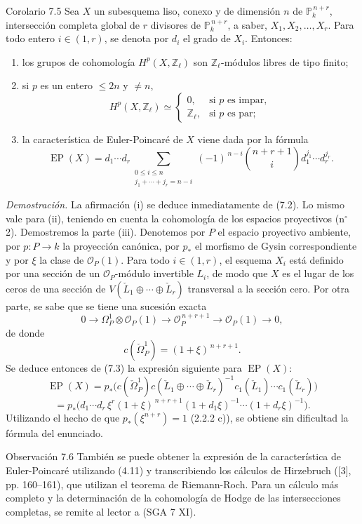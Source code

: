 \begin{statement}{Corolario 7.5}
Sea $X$ un subesquema liso, conexo y de dimensión $n$ de $\mathbb P_k^{\,n+r}$, intersección completa global de $r$ divisores de $\mathbb P_k^{\,n+r}$, a saber, $X_1,X_2,\ldots,X_r$. Para todo entero $i\in(1,r)$, se denota por $d_i$ el grado de $X_i$. Entonces:
\begin{enumerate}[label=(\roman*)]
\item los grupos de cohomología $H^p(X,\mathbb Z_\ell)$ son $\mathbb Z_\ell$-módulos libres de tipo finito;
\item si $p$ es un entero $\le 2n$ y $\ne n$,
\[
H^p(X,\mathbb Z_\ell)\simeq
\begin{cases}
0,&\text{si }p\text{ es impar},\\
\mathbb Z_\ell,&\text{si }p\text{ es par};
\end{cases}
\]
\item la característica de Euler-Poincaré de $X$ viene dada por la fórmula
\[
\operatorname{EP}(X)
=d_1\cdots d_r
\sum_{\substack{0\le i\le n\\ j_1+\cdots+j_r=n-i}}
(-1)^{\,n-i}\binom{n+r+1}{i}
d_1^{j_1}\cdots d_r^{j_r}.
\]
\end{enumerate}
\end{statement}

\emph{Demostración.} La afirmación (i) se deduce inmediatamente de (7.2). Lo mismo vale para (ii), teniendo en cuenta la cohomología de los espacios proyectivos (n$^\circ$ 2). Demostremos la parte (iii). Denotemos por $P$ el espacio proyectivo ambiente, por $p:P\to k$ la proyección canónica, por $p_*$ el morfismo de Gysin correspondiente y por $\xi$ la clase de $\mathcal O_P(1)$. Para todo $i\in(1,r)$, el esquema $X_i$ está definido por una sección de un $\mathcal O_P$-módulo invertible $L_i$, de modo que $X$ es el lugar de los ceros de una sección de $V(\check L_1\oplus\cdots\oplus\check L_r)$ transversal a la sección cero. Por otra parte, se sabe que se tiene una sucesión exacta
\[
0\to\Omega_P^1\otimes\mathcal O_P(1)\to\mathcal O_P^{\,n+r+1}\to\mathcal O_P(1)\to0,
\]
de donde
\[
c(\check\Omega_P^1)=(1+\xi)^{\,n+r+1}.
\]
Se deduce entonces de (7.3) la expresión siguiente para $\operatorname{EP}(X)$:
\[
\operatorname{EP}(X)
=p_*\bigl(c(\check\Omega_P^1)c(\check L_1\oplus\cdots\oplus\check L_r)^{-1}
c_1(\check L_1)\cdots c_1(\check L_r)\bigr)
\]
\[
=p_*\bigl(d_1\cdots d_r\,\xi^r(1+\xi)^{\,n+r+1}
(1+d_1\xi)^{-1}\cdots(1+d_r\xi)^{-1}\bigr).
\]
Utilizando el hecho de que $p_*(\xi^{n+r})=1$ (2.2.2 c)), se obtiene sin dificultad la fórmula del enunciado.

\begin{statement}{Observación 7.6}
También se puede obtener la expresión de la característica de Euler-Poincaré utilizando (4.11) y transcribiendo los cálculos de Hirzebruch ([3], pp. 160--161), que utilizan el teorema de Riemann-Roch. Para un cálculo más completo y la determinación de la cohomología de Hodge de las intersecciones completas, se remite al lector a (SGA 7 XI).
\end{statement}
